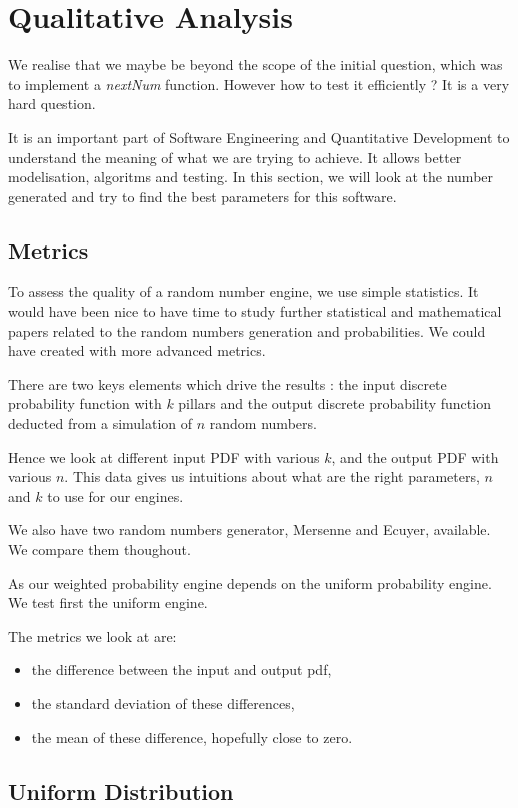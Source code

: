 \documentclass[12pt,a4paper,article]{memoir} %
\begin{document}
\section{Qualitative Analysis}
We realise that we maybe be beyond the scope of the initial
question, which was to implement a \emph{nextNum} function.
However how to test it efficiently ? It is a very hard question.

It is an important part of Software Engineering and 
Quantitative Development to understand the 
meaning of what we are trying to achieve. 
It allows better modelisation, algoritms and testing. 
In this section, we will look at the number generated and try
to find the best parameters for this software.

\subsection{Metrics}
To assess the quality of a random number engine, we use
simple statistics. It would have been nice to have time to 
study further statistical and mathematical papers related 
to the random numbers generation and probabilities.
We could have created with more advanced metrics.

There are two keys elements which drive the results :
the input discrete probability function with $k$ pillars and
the output discrete probability function deducted from a
simulation of $n$ random numbers.

Hence we look at different input PDF with various $k$,
and the output PDF with various $n$. 
This data gives us intuitions about what are the right
parameters, $n$ and $k$ to use for our engines.

We also have two random numbers generator, 
Mersenne and Ecuyer, available. We compare them thoughout.

As our weighted probability engine depends on
the uniform probability engine. 
We test first the uniform engine.

The metrics we look at are:
\begin{itemize}
	\item the difference between the input and output pdf,
	\item the standard deviation of these differences,
	\item the mean of these difference, hopefully close to zero.
\end{itemize}

\subsection{Uniform Distribution}
\end{document}
